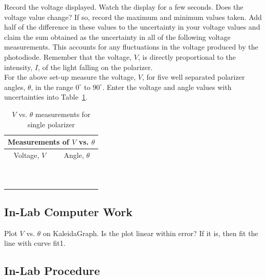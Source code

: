 \noindent Record the voltage displayed.  
Watch the display for a few seconds. Does 
the voltage value change? If so, record the maximum and minimum values taken. 
Add half of the difference in these values to the uncertainty in 
your voltage values and claim the sum obtained as the uncertainty in all
of the following voltage measurements. This accounts for any fluctuations in
the voltage produced by the photodiode. Remember that the voltage, $V$, is 
directly proportional to the intensity, $I$, of the light falling on the 
polarizer. \\

\noindent For the above set-up measure the voltage, $V$, 
for five well separated 
polarizer angles, $\theta$, in the range $0^\circ$ to $90^\circ$.  Enter the 
voltage and angle values with uncertainties into Table~\ref{tab:PO:1lens}.

\begin{table}[htb]
\begin{center}
\begin{tabular}{|c|c|}
\hline
\multicolumn{2}{|c|}{Measurements of $V$ vs. $\theta$} \\
\hline
Voltage, $V$ & Angle, $\theta$  \\
\hline
\hspace*{3cm} & \hspace*{3cm}  \\
&   \\
\hline
&   \\
&  \\
\hline
& \\
& \\
\hline
&  \\
&  \\
\hline
&  \\
&  \\
\hline
\end{tabular}
\end{center}
\caption{$V$ vs. $\theta$ measurements for single polarizer}
\label {tab:PO:1lens}
\end{table}


\subsection{In-Lab Computer Work}

Plot $V$ vs. $\theta$ on KaleidaGraph.  Is the plot linear within error?  
If it is, then 
fit the line with curve fit1. 

\subsection{In-Lab Procedure}
